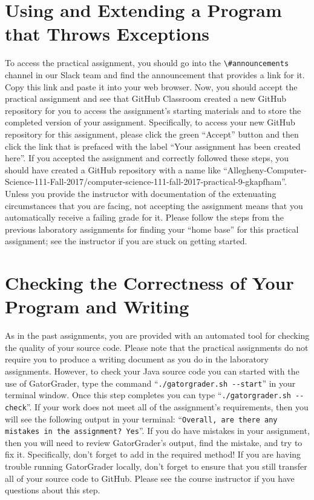 \documentclass[11pt]{article}
\newcommand{\gatorgraderstart}{\command{./gatorgrader.sh --start}}
\newcommand{\gatorgradercheck}{\command{./gatorgrader.sh --check}}
\newcommand{\command}[1]{``\lstinline{#1}''}
\newcommand{\channel}[1]{\lstinline{#1}}
\begin{document}
\section*{Using and Extending a Program that Throws Exceptions}

To access the practical assignment, you should go into the \channel{\#announcements} channel in our Slack team and find
the announcement that provides a link for it. Copy this link and paste it into your web browser. Now, you should accept
the practical assignment and see that GitHub Classroom created a new GitHub repository for you to access the
assignment's starting materials and to store the completed version of your assignment. Specifically, to access your new
GitHub repository for this assignment, please click the green ``Accept'' button and then click the link that is prefaced
with the label ``Your assignment has been created here''. If you accepted the assignment and correctly followed these
steps, you should have created a GitHub repository with a name like
``Allegheny-Computer-Science-111-Fall-2017/computer-science-111-fall-2017-practical-9-gkapfham''. Unless you provide the
instructor with documentation of the extenuating circumstances that you are facing, not accepting the assignment means
that you automatically receive a failing grade for it. Please follow the steps from the previous laboratory assignments
for finding your ``home base'' for this practical assignment; see the instructor if you are stuck on getting started.











\section*{Checking the Correctness of Your Program and Writing}

As in the past assignments, you are provided with an automated tool for checking the quality of your source code. Please
note that the practical assignments do not require you to produce a writing document as you do in the laboratory
assignments. However, to check your Java source code you can started with the use of GatorGrader, type the command
\gatorgraderstart{} in your terminal window. Once this step completes you can type \gatorgradercheck{}. If your work
does not meet all of the assignment's requirements, then you will see the following output in your terminal:
\command{Overall, are there any mistakes in the assignment? Yes}. If you do have mistakes in your assignment, then you
will need to review GatorGrader's output, find the mistake, and try to fix it. Specifically, don't forget to add in the
required method! If you are having trouble running GatorGrader locally, don't forget to ensure that you still transfer
all of your source code to GitHub. Please see the course instructor if you have questions about this step.
\end{document}
